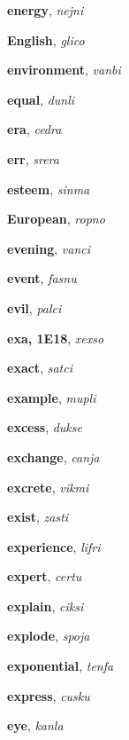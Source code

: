 \documentclass[12pt]{book}
\begin{document}
\begin{description}
\item[ ] \textbf{energy}, \textit{nejni}

\item[ ] \textbf{English}, \textit{glico}

\item[ ] \textbf{environment}, \textit{vanbi}

\item[ ] \textbf{equal}, \textit{dunli}

\item[ ] \textbf{era}, \textit{cedra}

\item[ ] \textbf{err}, \textit{srera}

\item[ ] \textbf{esteem}, \textit{sinma}

\item[ ] \textbf{European}, \textit{ropno}

\item[ ] \textbf{evening}, \textit{vanci}

\item[ ] \textbf{event}, \textit{fasnu}

\item[ ] \textbf{evil}, \textit{palci}

\item[ ] \textbf{exa, 1E18}, \textit{xexso}

\item[ ] \textbf{exact}, \textit{satci}

\item[ ] \textbf{example}, \textit{mupli}

\item[ ] \textbf{excess}, \textit{dukse}

\item[ ] \textbf{exchange}, \textit{canja}

\item[ ] \textbf{excrete}, \textit{vikmi}

\item[ ] \textbf{exist}, \textit{zasti}

\item[ ] \textbf{experience}, \textit{lifri}

\item[ ] \textbf{expert}, \textit{certu}

\item[ ] \textbf{explain}, \textit{ciksi}

\item[ ] \textbf{explode}, \textit{spoja}

\item[ ] \textbf{exponential}, \textit{tenfa}

\item[ ] \textbf{express}, \textit{cusku}

\item[ ] \textbf{eye}, \textit{kanla}



\end{description}
\end{document}
